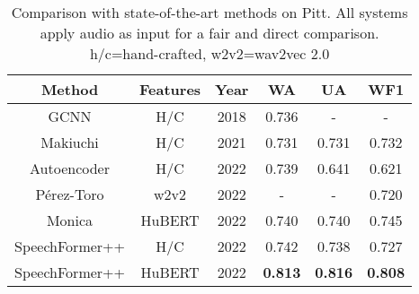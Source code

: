 \documentclass[lettersize,journal]{IEEEtran}
\begin{document}
\begin{table}[t]
    \caption{Comparison with state-of-the-art methods on Pitt. All systems apply audio as input for a fair and direct comparison. h/c=hand-crafted, w2v2=wav2vec 2.0}
    \label{tab_6}
    \centering
    \begin{threeparttable}
    \begin{tabular}{ccc||ccc}
    \hline
    Method  & Features  & Year   & WA  & UA & WF1    \\ \hline
    GCNN\cite{GCNN} & H/C & 2018 & 0.736 & - & - \\
    Makiuchi\cite{Makiuchi}  & H/C & 2021 & 0.731  & 0.731 & 0.732 \\
    Autoencoder\cite{Autoencoder}  & H/C    & 2022   & 0.739   & 0.641 & 0.621 \\
    P\'{e}rez-Toro\cite{pitt_use_w2v2} & w2v2 & 2022 & - & - & 0.720 \\
    Monica\cite{Monica} & HuBERT & 2022 & 0.740 & 0.740 & 0.745 \\ \hline
    SpeechFormer++   & H/C  & 2022  & 0.742   & 0.738  & 0.727 \\
    SpeechFormer++   & HuBERT  & 2022  & \textbf{0.813}   & \textbf{0.816}  & \textbf{0.808} \\ \hline
    \end{tabular}
    \end{threeparttable}
\end{table}

\begin{table}[t]
    \caption{Performance and computational efficiency of Transformer and SpeechFormer++ using HuBERT features on DAIC-WOZ.\\Gain indicates the relative improvement (+) or reduction (-)}
    \label{tab_7}
    \centering
\end{table}
\end{document}
